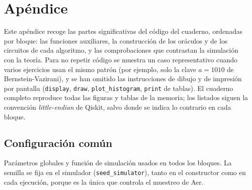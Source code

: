 \section{Apéndice}\label{sec:apendice}

Este apéndice recoge las partes significativas del código del cuaderno, ordenadas por bloque: las funciones auxiliares, la construcción de los oráculos y de los circuitos de cada algoritmo,
y las comprobaciones que contrastan la simulación con la teoría. Para no repetir código se muestra un caso representativo cuando varios ejercicios usan el mismo patrón
(por ejemplo, solo la clave $a=1010$ de Bernstein-Vazirani), y se han omitido las instrucciones de dibujo y de impresión por pantalla (\texttt{display}, \texttt{draw}, \texttt{plot\_histogram}, \texttt{print} de tablas).
El cuaderno completo reproduce todas las figuras y tablas de la memoria; los listados siguen la convención \textit{little-endian} de Qiskit, salvo donde se indica lo contrario en cada bloque.

\renewcommand{\lstlistingname}{Código}

\subsection{Configuración común}

Parámetros globales y función de simulación usados en todos los bloques. La semilla se fija en el simulador (\texttt{seed\_simulator}), tanto en el constructor como en cada ejecución, porque es la única que controla el muestreo de Aer.

